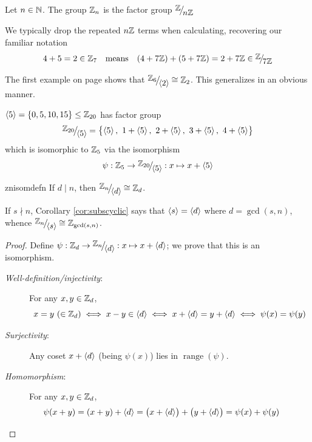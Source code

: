 \begin{defn}{}{}
	Let $n\in\mathbb{N}$. The group $\mathbb{Z}_n$ is the factor group $\quotient{\Z}{n\Z}$
\end{defn}

We typically drop the repeated $n\mathbb{Z}$ terms when calculating, recovering our familiar notation
\[
	4+5=2\in\Z_7\quad\text{means}\quad (4+7\Z)+(5+7\Z)=2+7\Z \in\quotient{\Z}{7\Z}
\]


The first example on page \pageref{sec:factor} shows that $\quotient{\Z_6}{\ip 2} \cong\Z_2$. This generalizes in an obvious manner.

\begin{example}{}{}
	$\left\langle 5\right\rangle=\{0,5,10,15\}\le\mathbb{Z}_{20}$ has factor group
	\[
		\quotient{\Z_{20}}{\ip 5}=\bigl\{\ip 5,\ 1+\ip 5,\ 2+\ip 5,\ 3+\ip 5,\ 4+\ip 5\bigr\}
	\]
	which is isomorphic to $\mathbb{Z}_5$ via the isomorphism
	\[
		\psi:\Z_5\to\quotient{\Z_{20}}{\ip 5}:x\mapsto x+\ip 5
	\]
\end{example}


\begin{thm}{}{znisomdefn}
	If $d\mid n$, then $\quotient{\Z_n}{\ip d}\cong\Z_d$.
\end{thm}

If $s\nmid n$, Corollary \ref{cor:subscyclic} says that $\left\langle s\right\rangle=\left\langle d\right\rangle$ where $d=\gcd(s,n)$, whence $\quotient{\Z_n}{\ip s}\cong\Z_{\gcd(s,n)}$.

\begin{proof}
	Define $\smash[b]{\psi:\Z_d\to\quotient{\Z_n}{\ip d}:x\mapsto x+\ip d}$; we prove that this is an isomorphism.
	\begin{description}%
		\item[\normalfont\emph{Well-definition/injectivity}:\footnotemark] For any $x,y\in\mathbb{Z}_d$,
		\[
			x=y\ (\in\mathbb{Z}_d)\iff x-y\in\left\langle d\right\rangle\iff x+\left\langle d\right\rangle=y+\left\langle d\right\rangle\iff \psi(x)=\psi(y)
		\]\vspace{-20pt}
		\item[\normalfont\emph{Surjectivity}:] Any coset $x+\left\langle d\right\rangle$ (being $\psi(x)$) lies in $\operatorname{range}(\psi)$.	
		\item[\normalfont\emph{Homomorphism}:] For any $x,y\in\mathbb{Z}_d$,
		\[\psi(x+y)=(x+y)+\left\langle d\right\rangle=\bigl(x+\left\langle d\right\rangle\bigr)+\bigl(y+\left\langle d\right\rangle\bigr)=\psi(x)+\psi(y)\tag*{\qedhere}\]
	\end{description}
\end{proof}

